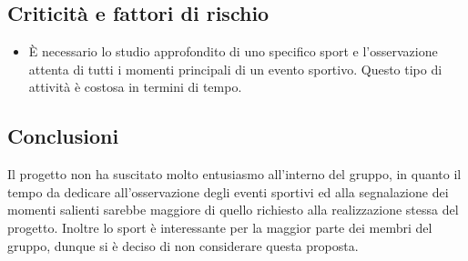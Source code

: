 \documentclass[../studio-di-fattibilita.tex]{subfiles}
\begin{document}
\subsection{Criticità e fattori di rischio}%
\label{sec:criticita_e_fattori_di_rischio}
\begin{itemize}
  \item È necessario lo studio approfondito di uno specifico sport e l'osservazione attenta di tutti i momenti principali di un evento sportivo. Questo tipo di attività è costosa in termini di tempo.
\end{itemize}


\subsection{Conclusioni}%
\label{subsec:conclusioni}
Il progetto non ha suscitato molto entusiasmo all'interno del gruppo, in quanto il tempo da dedicare all'osservazione degli eventi sportivi ed alla segnalazione dei momenti salienti sarebbe maggiore di quello richiesto alla realizzazione stessa del progetto. Inoltre lo sport è interessante per la maggior parte dei membri del gruppo, dunque si è deciso di non considerare questa proposta.
\end{document}
